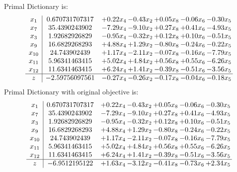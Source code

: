 \documentclass[9pt]{article}
\begin{document}
Primal Dictionary is:
\[\begin{array}{c| c c@{\hskip 2pt} c@{\hskip 2pt} c@{\hskip 2pt} c@{\hskip 2pt} c@{\hskip 2pt} }
 x_{1}   &  0.670731707317 & +  0.22 x_{4} & -0.43 x_{2} & +  0.05 x_{8} & -0.06 x_{6} & -0.30 x_{5}\\
 x_{7}   &  35.4390243902 & -7.29 x_{4} & -9.10 x_{2} & +  0.27 x_{8} & +  0.41 x_{6} & -4.93 x_{5}\\
 x_{3}   &  1.92682926829 & -0.95 x_{4} & -0.32 x_{2} & +  0.12 x_{8} & +  0.10 x_{6} & -0.51 x_{5}\\
 x_{9}   &  16.6829268293 & +  4.88 x_{4} & +  1.29 x_{2} & -0.80 x_{8} & -0.24 x_{6} & -0.22 x_{5}\\
 x_{10}   &  24.743902439 & +  1.17 x_{4} & -2.11 x_{2} & -0.07 x_{8} & -0.16 x_{6} & -7.79 x_{5}\\
 x_{11}   &  5.96341463415 & +  5.02 x_{4} & +  4.84 x_{2} & +  0.56 x_{8} & +  0.55 x_{6} & -6.26 x_{5}\\
 x_{12}   &  11.6341463415 & +  6.24 x_{4} & +  1.41 x_{2} & -0.39 x_{8} & -0.51 x_{6} & -3.56 x_{5}\\
\hline
z    &  -2.59756097561 & -0.27 x_{4} & -0.26 x_{2} & -0.17 x_{8} & -0.04 x_{6} & -0.18 x_{5}\\
\end{array}\]
Primal Dictionary with original objective is:
\[\begin{array}{c| c c@{\hskip 2pt} c@{\hskip 2pt} c@{\hskip 2pt} c@{\hskip 2pt} c@{\hskip 2pt} }
 x_{1}   &  0.670731707317 & +  0.22 x_{4} & -0.43 x_{2} & +  0.05 x_{8} & -0.06 x_{6} & -0.30 x_{5}\\
 x_{7}   &  35.4390243902 & -7.29 x_{4} & -9.10 x_{2} & +  0.27 x_{8} & +  0.41 x_{6} & -4.93 x_{5}\\
 x_{3}   &  1.92682926829 & -0.95 x_{4} & -0.32 x_{2} & +  0.12 x_{8} & +  0.10 x_{6} & -0.51 x_{5}\\
 x_{9}   &  16.6829268293 & +  4.88 x_{4} & +  1.29 x_{2} & -0.80 x_{8} & -0.24 x_{6} & -0.22 x_{5}\\
 x_{10}   &  24.743902439 & +  1.17 x_{4} & -2.11 x_{2} & -0.07 x_{8} & -0.16 x_{6} & -7.79 x_{5}\\
 x_{11}   &  5.96341463415 & +  5.02 x_{4} & +  4.84 x_{2} & +  0.56 x_{8} & +  0.55 x_{6} & -6.26 x_{5}\\
 x_{12}   &  11.6341463415 & +  6.24 x_{4} & +  1.41 x_{2} & -0.39 x_{8} & -0.51 x_{6} & -3.56 x_{5}\\
\hline
z    &  -6.9512195122 & +  1.63 x_{4} & -3.12 x_{2} & -0.41 x_{8} & -0.73 x_{6} & +  2.34 x_{5}\\
\end{array}\]
\end{document}
